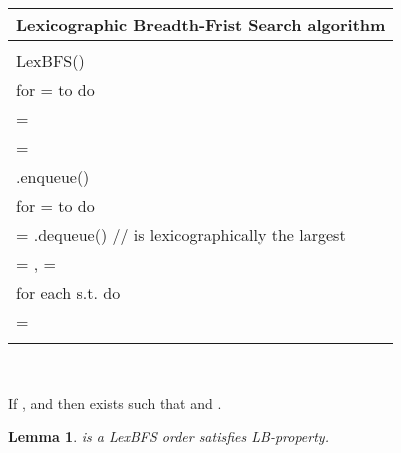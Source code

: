 \documentclass[a4paper, 11pt]{article}
\newtheorem{lm}[tw]{Lemma}
\newenvironment{pr}[1][Property]{\begin{trivlist}
\item[\hskip \labelsep {\bfseries #1}]}{\end{trivlist}}
\begin{document}
\begin{tabular}{l}
\hline
Lexicographic Breadth-Frist Search algorithm\\
\hline
\\
LexBFS()\\
\hspace{0.5cm}  for  =  to  do\\
\hspace{1cm}         = \\\hspace{1cm}         = \\
\hspace{1cm}        .enqueue()\\
\hspace{0.5cm}  for  =  to  do\\
\hspace{1cm}         = .dequeue() // is lexicographically the largest\\
\hspace{1cm}         = ,  = \\
\hspace{1cm}        for each  s.t.  do\\
\hspace{1.5cm}           = \\
\\
\hline

\end{tabular}\\

\begin{pr}[Property LB.]
    If ,  and  then exists  such that  and 
    . 
\end{pr}

\begin{lm}
     is a LexBFS order   satisfies LB-property.
\end{lm}
\end{document}
